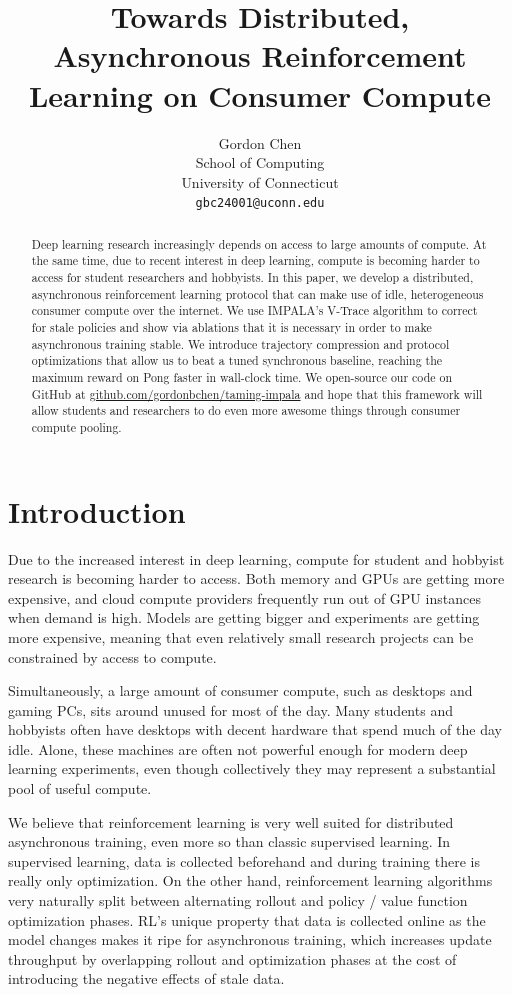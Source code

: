\documentclass{article}
\title{Towards Distributed, Asynchronous Reinforcement Learning on Consumer Compute}
\author{
Gordon Chen\\
School of Computing\\
University of Connecticut\\
\texttt{gbc24001@uconn.edu}\\
}
\begin{document}
\maketitle

\begin{abstract}
Deep learning research increasingly depends on access to large amounts of compute. At the same time,
due to recent interest in deep learning, compute is becoming harder to access for student researchers
and hobbyists.
In this paper, we develop a distributed, asynchronous reinforcement learning protocol
that can make use of idle, heterogeneous consumer compute over the internet.
We use IMPALA's V-Trace algorithm to correct for stale policies and show via ablations that it is
necessary in order to make asynchronous training stable.
We introduce trajectory compression and protocol optimizations that allow us to beat a tuned
synchronous baseline, reaching the maximum reward on Pong faster in wall-clock time.
We open-source our code on GitHub at
\href{https://github.com/gordonbchen/taming-impala}{github.com/gordonbchen/taming-impala}
and hope that this framework will allow students and researchers to do even more awesome
things through consumer compute pooling.
\end{abstract}


\section{Introduction}
Due to the increased interest in deep learning, compute for student and hobbyist research is becoming harder
to access. Both memory and GPUs are getting more expensive, and cloud compute providers frequently run out of
GPU instances when demand is high. Models are getting bigger and experiments are getting more expensive,
meaning that even relatively small research projects can be constrained by access to compute.

Simultaneously, a large amount of consumer compute, such as desktops and gaming PCs,
sits around unused for most of the day. Many students and hobbyists often have desktops with decent hardware
that spend much of the day idle. Alone, these machines are often not powerful enough
for modern deep learning experiments, even though collectively they may represent a substantial pool
of useful compute.

We believe that reinforcement learning is very well suited for distributed asynchronous training, even
more so than classic supervised learning. In supervised learning, data is collected beforehand and during
training there is really only optimization. On the other hand, reinforcement learning algorithms very
naturally split between alternating rollout and policy / value function optimization phases. RL's unique
property that data is collected online as the model changes makes it ripe for asynchronous training, which
increases update throughput by overlapping rollout and optimization phases at the cost of introducing
the negative effects of stale data.
\end{document}
